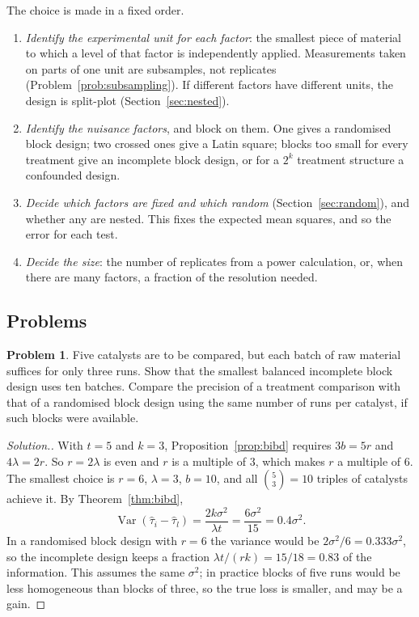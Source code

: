 \documentclass[11pt,a4paper]{article}
\numberwithin{equation}{section}
\DeclareMathOperator{\Var}{Var}
\theoremstyle{definition}
\newtheorem{problemx}{Problem}[subsection]
\newenvironment{problem}{\begin{problemx}}{\end{problemx}}
\newenvironment{solution}
  {\renewcommand{\qedsymbol}{}\begin{proof}[\textit{Solution}.]}
  {\end{proof}}
\begin{document}
The choice is made in a fixed order.
\begin{enumerate}[label=(\arabic*)]
\item \emph{Identify the experimental unit for each factor}: the smallest piece of material to which a level of that factor is independently applied.
Measurements taken on parts of one unit are subsamples, not replicates (Problem~\ref{prob:subsampling}). If different factors have different units, the design
is split-plot (Section~\ref{sec:nested}).
\item \emph{Identify the nuisance factors}, and block on them. One gives a randomised block design; two crossed ones give a Latin square; blocks too small
for every treatment give an incomplete block design, or for a $2^k$ treatment structure a confounded design.
\item \emph{Decide which factors are fixed and which random} (Section~\ref{sec:random}), and whether any are nested. This fixes the expected mean squares,
and so the error for each test.
\item \emph{Decide the size}: the number of replicates from a power calculation, or, when there are many factors, a fraction of the resolution needed.
\end{enumerate}

\subsection{Problems}

\begin{problem}
Five catalysts are to be compared, but each batch of raw material suffices for only three runs. Show that the smallest balanced incomplete block design
uses ten batches. Compare the precision of a treatment comparison with that of a randomised block design using the same number of runs per
catalyst, if such blocks were available.
\end{problem}

\begin{solution}
With $t = 5$ and $k = 3$, Proposition~\ref{prop:bibd} requires $3b = 5r$ and $4\lambda = 2r$. So $r = 2\lambda$ is even and $r$ is a multiple of $3$, which makes $r$ a multiple
of $6$. The smallest choice is $r = 6$, $\lambda = 3$, $b = 10$, and all $\binom53 = 10$ triples of catalysts achieve it. By Theorem~\ref{thm:bibd},
\[
\Var(\hat\tau_i - \hat\tau_l) = \frac{2k\sigma^2}{\lambda t} = \frac{6\sigma^2}{15} = 0.4\sigma^2 .
\]
In a randomised block design with $r = 6$ the variance would be $2\sigma^2/6 = 0.333\sigma^2$, so the incomplete design keeps a fraction
$\lambda t/(rk) = 15/18 = 0.83$ of the information. This assumes the same $\sigma^2$; in practice blocks of five runs would be less homogeneous than blocks of
three, so the true loss is smaller, and may be a gain.
\end{solution}
\end{document}
